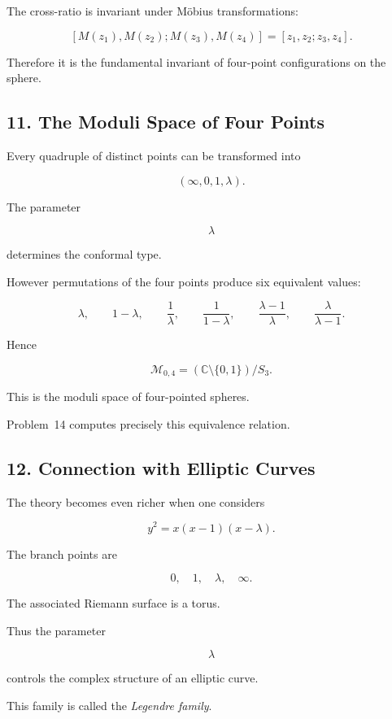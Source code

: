 \documentclass[12pt,a4paper]{article}
\theoremstyle{notespace}
\begin{document}
The cross-ratio is invariant under Möbius transformations:

\[
[M(z_1),M(z_2);M(z_3),M(z_4)]
=
[z_1,z_2;z_3,z_4].
\]

Therefore it is the fundamental invariant of four-point configurations on the sphere.

\bigskip

\subsection{11. The Moduli Space of Four Points}

Every quadruple of distinct points can be transformed into

\[
(\infty,0,1,\lambda).
\]

The parameter

\[
\lambda
\]

determines the conformal type.

However permutations of the four points produce six equivalent values:

\[
\lambda,
\qquad
1-\lambda,
\qquad
\frac1\lambda,
\qquad
\frac1{1-\lambda},
\qquad
\frac{\lambda-1}{\lambda},
\qquad
\frac{\lambda}{\lambda-1}.
\]

Hence

\[
\boxed{
	\mathcal M_{0,4}
	=
	(\mathbb C\setminus\{0,1\})/S_3.
}
\]

This is the moduli space of four-pointed spheres.

Problem~14 computes precisely this equivalence relation.

\bigskip

\subsection{12. Connection with Elliptic Curves}

The theory becomes even richer when one considers

\[
y^2
=
x(x-1)(x-\lambda).
\]

The branch points are

\[
0,\quad1,\quad\lambda,\quad\infty.
\]

The associated Riemann surface is a torus.

Thus the parameter

\[
\lambda
\]

controls the complex structure of an elliptic curve.

This family is called the \emph{Legendre family}.
\end{document}
